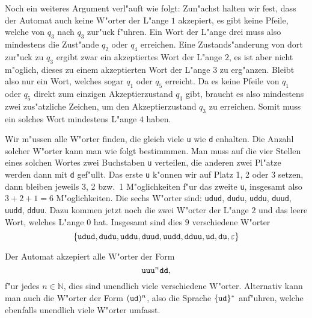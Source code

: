{\begin{loesung}
\begin{teilaufgaben}
Noch ein weiteres Argument verl"auft wie folgt:
Zun"achst halten wir fest, dass der Automat auch keine W"orter der
L"ange $1$ akzepiert, es gibt keine Pfeile, welche von $q_3$ nach
$q_3$ zur"uck f"uhren. Ein Wort der L"ange drei muss also mindestens
die Zust"ande $q_2$ oder $q_4$ erreichen. Eine Zustands"anderung von
dort zur"uck zu $q_3$ ergibt zwar ein akzeptiertes Wort der L"ange
$2$, es ist aber nicht m"oglich, dieses zu einem akzeptierten Wort
der L"ange $3$ zu erg"anzen.
Bleibt also nur ein Wort, welches
sogar $q_1$ oder $q_5$ erreicht. Da es keine Pfeile von $q_1$
oder $q_5$ direkt zum einzigen Akzeptierzustand $q_3$ gibt,
braucht es also mindestens zwei zus"atzliche Zeichen, um den
Akzeptierzustand $q_3$ zu erreichen. Somit muss ein solches
Wort mindestens L"ange $4$ haben.
\item Wir m"ussen alle W"orter finden, die gleich viele {\tt u} wie {\tt d}
enhalten. Die Anzahl solcher W"orter kann man wie folgt bestimmmen.
Man muss auf die vier Stellen eines solchen Wortes zwei Buchstaben
{\tt u} verteilen, die anderen zwei Pl"atze werden dann mit {\tt d}
gef"ullt. Das erste {\tt u} k"onnen wir auf Platz 1, 2 oder 3 setzen,
dann bleiben jeweils 3, 2 bzw.~1 M"oglichkeiten f"ur das zweite {\tt u},
insgesamt also $3+2+1=6$ M"oglichkeiten. Die sechs W"orter sind:
{\tt udud}, {\tt dudu}, {\tt uddu}, {\tt duud}, {\tt uudd}, {\tt dduu}.
Dazu kommen jetzt noch die zwei W"orter der L"ange $2$ und das leere Wort,
welches L"ange $0$ hat. Insgesamt sind dies $9$ verschiedene W"orter
\[
\{
{\tt udud}, {\tt dudu}, {\tt uddu}, {\tt duud}, {\tt uudd}, {\tt dduu},
{\tt ud},{\tt du}, \varepsilon
\}
\]
\item Der Automat akzepiert alle W"orter der Form
\[
\text{\tt uu}
\text{\tt u}^n
\text{\tt dd},
\]
f"ur jedes $n\in \mathbb N$,
dies sind unendlich viele verschiedene W"orter. Alternativ kann
man auch die W"orter der Form $({\tt ud})^n$, also die Sprache
$\{{\tt ud}\}^*$ anf"uhren, welche ebenfalls unendlich viele W"orter
umfasst.
\end{teilaufgaben}
\end{loesung}
}{}


